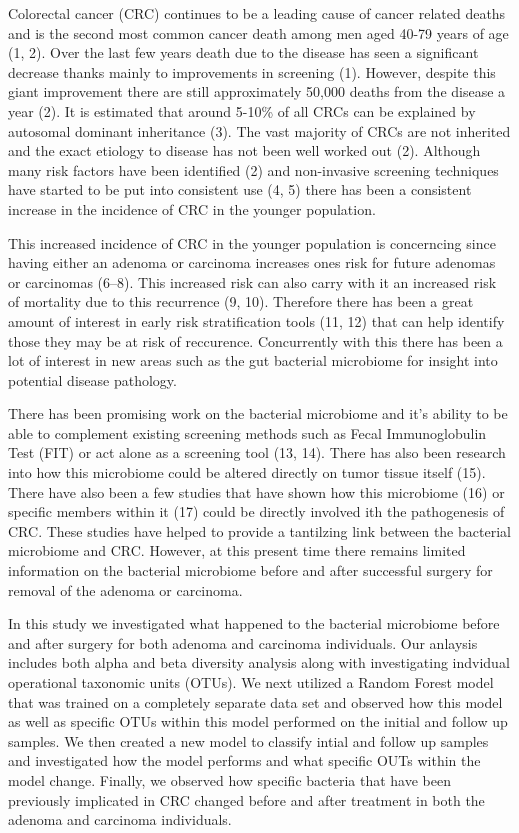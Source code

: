 \documentclass[12pt,]{article}
\begin{document}
Colorectal cancer (CRC) continues to be a leading cause of cancer
related deaths and is the second most common cancer death among men aged
40-79 years of age (1, 2). Over the last few years death due to the
disease has seen a significant decrease thanks mainly to improvements in
screening (1). However, despite this giant improvement there are still
approximately 50,000 deaths from the disease a year (2). It is estimated
that around 5-10\% of all CRCs can be explained by autosomal dominant
inheritance (3). The vast majority of CRCs are not inherited and the
exact etiology to disease has not been well worked out (2). Although
many risk factors have been identified (2) and non-invasive screening
techniques have started to be put into consistent use (4, 5) there has
been a consistent increase in the incidence of CRC in the younger
population.

This increased incidence of CRC in the younger population is concerncing
since having either an adenoma or carcinoma increases ones risk for
future adenomas or carcinomas (6--8). This increased risk can also carry
with it an increased risk of mortality due to this recurrence (9, 10).
Therefore there has been a great amount of interest in early risk
stratification tools (11, 12) that can help identify those they may be
at risk of reccurence. Concurrently with this there has been a lot of
interest in new areas such as the gut bacterial microbiome for insight
into potential disease pathology.

There has been promising work on the bacterial microbiome and it's
ability to be able to complement existing screening methods such as
Fecal Immunoglobulin Test (FIT) or act alone as a screening tool (13,
14). There has also been research into how this microbiome could be
altered directly on tumor tissue itself (15). There have also been a few
studies that have shown how this microbiome (16) or specific members
within it (17) could be directly involved ith the pathogenesis of CRC.
These studies have helped to provide a tantilzing link between the
bacterial microbiome and CRC. However, at this present time there
remains limited information on the bacterial microbiome before and after
successful surgery for removal of the adenoma or carcinoma.

In this study we investigated what happened to the bacterial microbiome
before and after surgery for both adenoma and carcinoma individuals. Our
anlaysis includes both alpha and beta diversity analysis along with
investigating indvidual operational taxonomic units (OTUs). We next
utilized a Random Forest model that was trained on a completely separate
data set and observed how this model as well as specific OTUs within
this model performed on the initial and follow up samples. We then
created a new model to classify intial and follow up samples and
investigated how the model performs and what specific OUTs within the
model change. Finally, we observed how specific bacteria that have been
previously implicated in CRC changed before and after treatment in both
the adenoma and carcinoma individuals.
\end{document}
